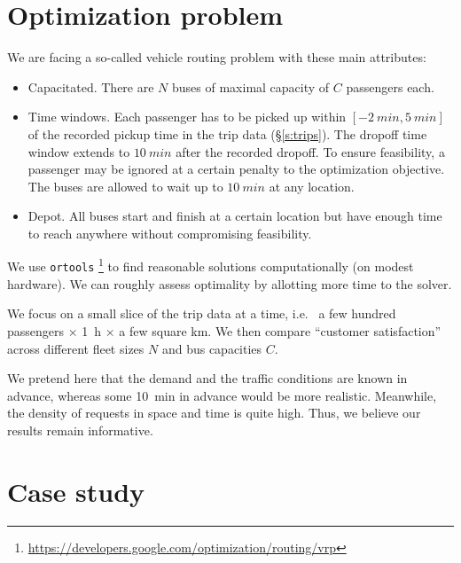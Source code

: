 \documentclass[12pt,notitlepage]{article}
\begin{document}
\section{Optimization problem}

We are facing
a so-called vehicle routing problem with these main attributes:
%
\begin{itemize}
\item
	Capacitated.
	There are $N$ buses of maximal capacity of $C$ passengers each.
\item
	Time windows.
	Each passenger has to be picked up
	within $[-\SI{2}{min}, \SI{5}{min}]$
	of
	the recorded pickup time in the trip data (\S\ref{s:trips}).
	The dropoff time window extends to $\SI{10}{min}$
	after the recorded dropoff.
	To ensure feasibility,
	a passenger may be ignored 
	at a certain penalty to the optimization objective.	
	The buses are allowed to wait up to $\SI{10}{min}$
	at any location.
\item
	Depot.
	All buses start and finish at a certain location
	but have enough time to reach anywhere
	without compromising feasibility.
\end{itemize}

%

We use \texttt{ortools}%
\footnote{\href{https://developers.google.com/optimization/routing/vrp}{https://developers.google.com/optimization/routing/vrp}}
to find reasonable solutions computationally (on modest hardware).
%
We can roughly assess optimality
by allotting more time to the solver.
%


%

We focus on a small slice of 
the trip data at a time,
i.e.~%
a few hundred passengers $\times$ \SI{1}{h} $\times$ a few square \si{km}.
%
We then compare ``customer satisfaction''
across different fleet sizes $N$ and bus capacities $C$.

%

We pretend here that the demand
and the traffic conditions
are known in advance,
whereas some \SI{10}{min} in advance
would be more realistic.
%
Meanwhile, the density of requests in space and time is quite high.
%
Thus, we believe our results remain informative.


\section{Case study} \label{s:case}
\end{document}
